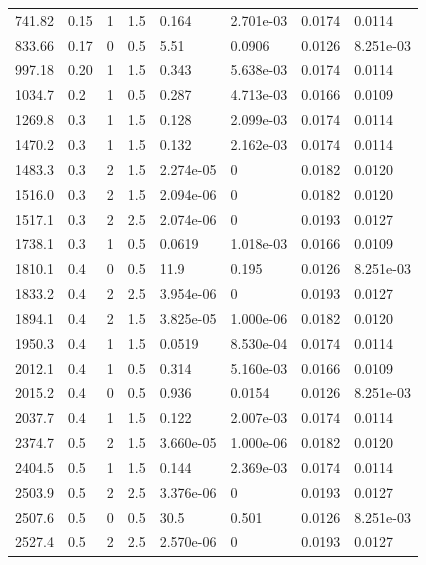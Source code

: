 \documentclass[preview]{standalone}
\begin{document}
{{\begin{tabular}{L{1.2cm}C{1.2cm} C{0.3cm}C{0.5cm} C{1.4cm}C{1.4cm} C{1.4cm}C{1.4cm}}
  741.82  &  0.15  & 1     & 1.5 &  0.164  & 2.701e-03  & 0.0174 &  0.0114   \\ 
  833.66  &  0.17  & 0     & 0.5 &  5.51  & 0.0906  & 0.0126 &  8.251e-03   \\ 
  997.18  &  0.20  & 1     & 1.5 &  0.343  & 5.638e-03  & 0.0174 &  0.0114   \\ 
  1034.7  &   0.2  & 1     & 0.5 &  0.287  & 4.713e-03  & 0.0166 &  0.0109   \\ 
  1269.8  &   0.3  & 1     & 1.5 &  0.128  & 2.099e-03  & 0.0174 &  0.0114   \\ 
  1470.2  &   0.3  & 1     & 1.5 &  0.132  & 2.162e-03  & 0.0174 &  0.0114   \\ 
  1483.3  &   0.3  & 2     & 1.5 &  2.274e-05  & 0  & 0.0182 &  0.0120   \\ 
  1516.0  &   0.3  & 2     & 1.5 &  2.094e-06  & 0  & 0.0182 &  0.0120   \\ 
  1517.1  &   0.3  & 2     & 2.5 &  2.074e-06  & 0  & 0.0193 &  0.0127   \\ 
  1738.1  &   0.3  & 1     & 0.5 &  0.0619  & 1.018e-03  & 0.0166 &  0.0109   \\ 
  1810.1  &   0.4  & 0     & 0.5 &  11.9  & 0.195  & 0.0126 &  8.251e-03   \\ 
  1833.2  &   0.4  & 2     & 2.5 &  3.954e-06  & 0  & 0.0193 &  0.0127   \\ 
  1894.1  &   0.4  & 2     & 1.5 &  3.825e-05  & 1.000e-06  & 0.0182 &  0.0120   \\ 
  1950.3  &   0.4  & 1     & 1.5 &  0.0519  & 8.530e-04  & 0.0174 &  0.0114   \\ 
  2012.1  &   0.4  & 1     & 0.5 &  0.314  & 5.160e-03  & 0.0166 &  0.0109   \\ 
  2015.2  &   0.4  & 0     & 0.5 &  0.936  & 0.0154  & 0.0126 &  8.251e-03   \\ 
  2037.7  &   0.4  & 1     & 1.5 &  0.122  & 2.007e-03  & 0.0174 &  0.0114   \\ 
  2374.7  &   0.5  & 2     & 1.5 &  3.660e-05  & 1.000e-06  & 0.0182 &  0.0120   \\ 
  2404.5  &   0.5  & 1     & 1.5 &  0.144  & 2.369e-03  & 0.0174 &  0.0114   \\ 
  2503.9  &   0.5  & 2     & 2.5 &  3.376e-06  & 0  & 0.0193 &  0.0127   \\ 
  2507.6  &   0.5  & 0     & 0.5 &  30.5  & 0.501  & 0.0126 &  8.251e-03   \\ 
  2527.4  &   0.5  & 2     & 2.5 &  2.570e-06  & 0  & 0.0193 &  0.0127   \\ 

\end{tabular}}}
\end{document}
